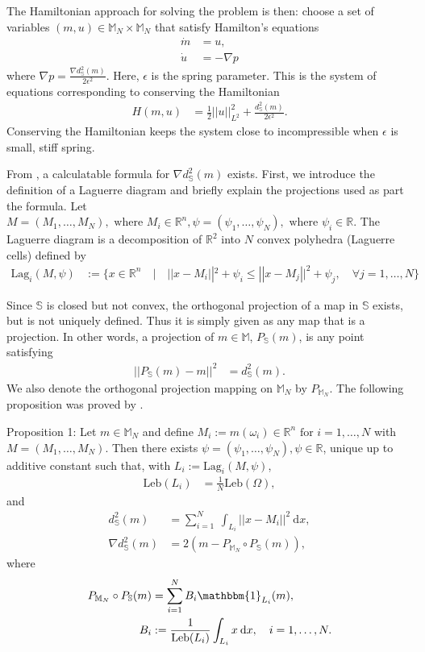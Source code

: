 \documentclass[11pt, oneside]{article}   	%
\newcommand{\R}{\mathbb{R}}
\newcommand{\MN}{\mathbb{M}_N}
\newcommand{\dsmsq}{d^{2}_{\mathbb{S}}(m)}
\newcommand{\graddsmsq}{\nabla{d^{2}_{\mathbb{S}}(m)}}
\newcommand{\M}{\mathbb{M}}
\newcommand{\Sb}{\mathbb{S}}
\newcommand{\Leb}{\mathrm{Leb}}
\begin{document}
The Hamiltonian approach for solving the problem is then: choose a set of variables \((m, u) \in \MN \times \MN \) that satisfy Hamilton's equations
\begin{align} 
\dot{m} &= u, \\
\dot{u} &= - \nabla p
\end{align}
where \(\nabla p = \frac{\graddsmsq}{2\epsilon^2}\). Here, \(\epsilon\) is the spring parameter. This is the system of equations corresponding to conserving the Hamiltonian
\begin{align} 
H(m, u) &= \frac{1}{2} ||u||^2_{L^2} + \frac{\dsmsq}{2\epsilon^2}.
\end{align}
Conserving the Hamiltonian keeps the system close to incompressible when \(\epsilon\) is small,  stiff spring. 

From \cite{gallouet2016lagrangian}, a calculatable formula for \(\graddsmsq\) exists. First, we introduce the definition of a Laguerre diagram and briefly explain the projections used as part the formula. Let \(M = (M_1,\dots,M_N), \text{ where } M_i \in \R^n, \psi = (\psi_1,\dots,\psi_N), \text{ where } \psi_i \in \R\). The Laguerre diagram is a decomposition of \(\R^2\) into \(N\) convex polyhedra (Laguerre cells) defined by
\begin{align}
\mathrm{Lag}_i(M, \psi) &:= \{x \in \R^n \quad | \quad || x - M_i ||^2 + \psi_i \le || x - M_j ||^2 + \psi_j, \quad \forall j = 1,\dots,N\}
\end{align}

Since \(\Sb\) is closed but not convex, the orthogonal projection of a map in \(\Sb\) exists, but is not uniquely defined. Thus it is simply given as any map that is a projection. In other words, a projection of \(m \in \M\), \(P_\Sb(m)\), is any point satisfying
\begin{align}
|| P_\Sb(m) - m ||^2 &= \dsmsq.
\end{align}
We also denote the orthogonal projection mapping on \(\MN\) by \(P_{\MN}\). The following proposition was proved by \cite{gallouet2016lagrangian}.

Proposition 1: Let \(m \in \MN\) and define \(M_i := m(\omega_i) \in \R^n \text{ for } i = 1,\dots,N\) with \(M = (M_1,\dots,M_N)\). Then there exists \(\psi = (\psi_1,\dots,\psi_N), \psi \in \R\), unique up to additive constant such that, with \(L_i := \mathrm{Lag}_i(M, \psi)\), 
\begin{align}
\Leb(L_i) &= \frac{1}{N}\Leb(\Omega),
\end{align}
and
\begin{align}
\dsmsq & = \sum_{i=1}^N \: \int_{L_i} || x - M_i ||^2 \: \mathrm{d}x, \\
\graddsmsq &= 2(m - P_{\MN} \circ P_{\mathbb{S}}(m)),
\end{align}
where
\begin{align}
P_{\MN} \circ P_{\mathbb{S}}(m) &= \sum^N_{i=1} B_i \mathbbm{1}_{L_i}(m), \\
B_i &:= \frac{1}{\Leb(L_i)} \int_{L_i} x \: \mathrm{d}x, \quad i = 1,\dots,N. 
\end{align}
\end{document}
